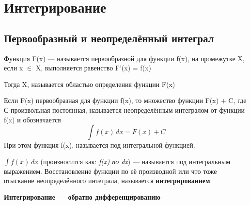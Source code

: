 \documentclass[a5paper]{article}
\begin{document}
	\section{Интегрирование}
	\subsection{Первообразный и неопределённый интеграл}
	
	Функция F(x) --- называется первообразной для функции f(x), на промежутке X, если x $\in$ X, выполняется равенство F'(x) = f(x)

	Тогда X, называется областью определения функции F(x)
	
	\vspace{\baselineskip}
	\begin{itshape}
		Если F(x) первообразная для функции f(x), то множество функции F(x) + C, где С произвольная постоянная, называется неопределённым интегралом от функции f(x) и обозначается 
		\begin{displaymath}
		\int f(x)\,dx=F(x)+C
		\end{displaymath}
		\vspace{\baselineskip}
		При этом функция f(x), называется под интегральной функцией.
	\end{itshape}
	
	\(\int f(x)\,dx\) (произносится как: \textit{f(x) по dx}) --- называется под интегральным выражением.
	Восстановление функции по её производной или что тоже отыскание неопределённого интеграла, называется \textbf{интегрированием}.
	
	\begin{center} \textbf{Интегрирование --- обратно дифференцированию}  \end{center}
	
\end{document}
